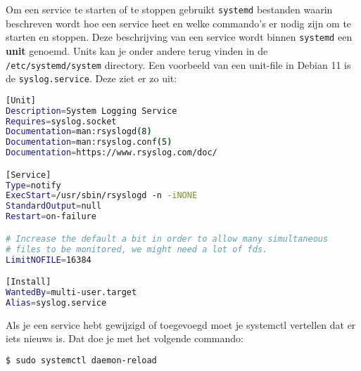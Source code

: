 Om een service te starten of te stoppen gebruikt \texttt{systemd} bestanden waarin beschreven wordt hoe een service heet en welke commando's er nodig zijn om te starten en stoppen. Deze beschrijving van een service wordt binnen \texttt{systemd} een \textbf{unit} genoemd. Units kan je onder andere terug vinden in de \texttt{/etc/systemd/system} directory. Een voorbeeld van een unit-file in Debian 11 is de \texttt{syslog.service}. Deze ziet er zo uit:

\begin{lstlisting}[language=bash]
[Unit]
Description=System Logging Service
Requires=syslog.socket
Documentation=man:rsyslogd(8)
Documentation=man:rsyslog.conf(5)
Documentation=https://www.rsyslog.com/doc/

[Service]
Type=notify
ExecStart=/usr/sbin/rsyslogd -n -iNONE
StandardOutput=null
Restart=on-failure

# Increase the default a bit in order to allow many simultaneous
# files to be monitored, we might need a lot of fds.
LimitNOFILE=16384

[Install]
WantedBy=multi-user.target
Alias=syslog.service
\end{lstlisting}

Als je een service hebt gewijzigd of toegevoegd moet je systemctl vertellen dat er iets nieuws is. Dat doe je met het volgende commando:
\begin{lstlisting}[language=bash]
$ sudo systemctl daemon-reload
\end{lstlisting}

